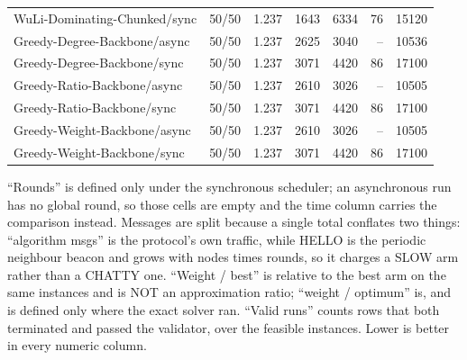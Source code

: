 \begin{table}[tb]
\begin{tabular}{lrrrrrr}
WuLi-Dominating-Chunked/sync & 50/50 & 1.237 & 1643 & 6334 & 76 & 15120 \\
Greedy-Degree-Backbone/async & 50/50 & 1.237 & 2625 & 3040 & -- & 10536 \\
Greedy-Degree-Backbone/sync & 50/50 & 1.237 & 3071 & 4420 & 86 & 17100 \\
Greedy-Ratio-Backbone/async & 50/50 & 1.237 & 2610 & 3026 & -- & 10505 \\
Greedy-Ratio-Backbone/sync & 50/50 & 1.237 & 3071 & 4420 & 86 & 17100 \\
Greedy-Weight-Backbone/async & 50/50 & 1.237 & 2610 & 3026 & -- & 10505 \\
Greedy-Weight-Backbone/sync & 50/50 & 1.237 & 3071 & 4420 & 86 & 17100 \\
\bottomrule
\end{tabular}
\begin{flushleft}\footnotesize
``Rounds'' is defined only under the synchronous scheduler; an asynchronous run has no global round, so those cells are empty and the time column carries the comparison instead. Messages are split because a single total conflates two things: ``algorithm msgs'' is the protocol's own traffic, while HELLO is the periodic neighbour beacon and grows with nodes times rounds, so it charges a SLOW arm rather than a CHATTY one. ``Weight / best'' is relative to the best arm on the same instances and is NOT an approximation ratio; ``weight / optimum'' is, and is defined only where the exact solver ran. ``Valid runs'' counts rows that both terminated and passed the validator, over the feasible instances. Lower is better in every numeric column.
\end{flushleft}
\end{table}
